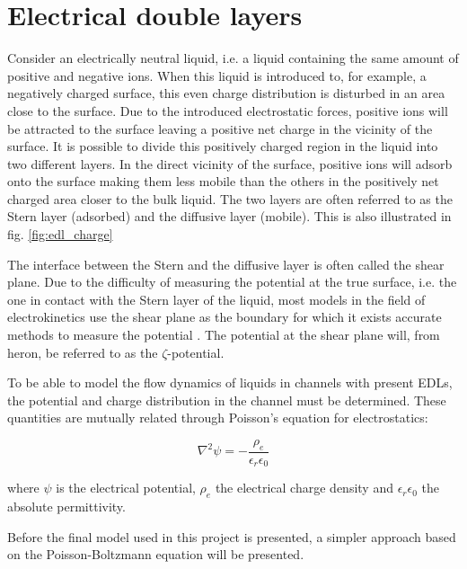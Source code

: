 \section{Electrical double layers}
Consider an electrically neutral liquid, i.e. a liquid containing the
same amount of positive and negative ions. When this liquid is
introduced to, for example, a negatively charged surface, this even
charge distribution is disturbed in an area close to the surface. Due
to the introduced electrostatic forces, positive ions will be
attracted to the surface leaving a positive net charge in the vicinity
of the surface. It is possible to divide this positively charged
region in the liquid into two different layers. In the direct vicinity
of the surface, positive ions will adsorb onto the surface making them
less mobile than the others in the positively net charged area closer
to the bulk liquid. The two layers are often referred to as the Stern
layer (adsorbed) and the diffusive layer (mobile). This is also
illustrated in fig. \ref{fig:edl_charge} \cite{ren_book}

The interface between the Stern and the diffusive layer is often
called the shear plane. Due to the difficulty of measuring the
potential at the true surface, i.e. the one in contact with the Stern
layer of the liquid, most models in the field of electrokinetics use the shear plane
as the boundary for which it exists accurate methods to measure the
potential \cite{ren_book}. The potential at the shear plane will,
from heron, be referred to as the $\zeta$-potential. 

To be able to model the flow dynamics of liquids in channels with
present EDLs, the potential and charge distribution in the channel
must be determined. These quantities are mutually related through
Poisson's equation for electrostatics:

\begin{equation}
\nabla^2\psi = -\frac{\rho_e}{\epsilon_r \epsilon_0}
\end{equation}

where $\psi$ is the electrical potential, $\rho_e$ the electrical
charge density and $\epsilon_r \epsilon_0$ the absolute permittivity. 

Before the final model used in this project is
presented, a simpler approach based on the Poisson-Boltzmann equation
will be presented. 




